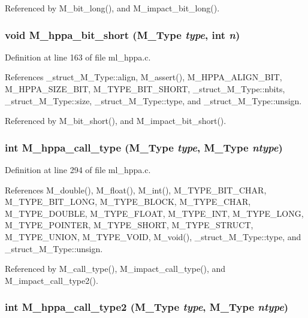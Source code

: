 Referenced by M\_\-bit\_\-long(), and M\_\-impact\_\-bit\_\-long().
\subsubsection{\setlength{\rightskip}{0pt plus 5cm}void M\_\-hppa\_\-bit\_\-short (\bf{M\_\-Type} {\em type}, int {\em n})}\label{m__hppa_8h_c495d0f8270eaa8cdfd5ea0fda482197}




Definition at line 163 of file ml\_\-hppa.c.

References \_\-struct\_\-M\_\-Type::align, M\_\-assert(), M\_\-HPPA\_\-ALIGN\_\-BIT, M\_\-HPPA\_\-SIZE\_\-BIT, M\_\-TYPE\_\-BIT\_\-SHORT, \_\-struct\_\-M\_\-Type::nbits, \_\-struct\_\-M\_\-Type::size, \_\-struct\_\-M\_\-Type::type, and \_\-struct\_\-M\_\-Type::unsign.

Referenced by M\_\-bit\_\-short(), and M\_\-impact\_\-bit\_\-short().
\subsubsection{\setlength{\rightskip}{0pt plus 5cm}int M\_\-hppa\_\-call\_\-type (\bf{M\_\-Type} {\em type}, \bf{M\_\-Type} {\em ntype})}\label{m__hppa_8h_659ffb78b03ab7d4c248e6ae8653d368}




Definition at line 294 of file ml\_\-hppa.c.

References M\_\-double(), M\_\-float(), M\_\-int(), M\_\-TYPE\_\-BIT\_\-CHAR, M\_\-TYPE\_\-BIT\_\-LONG, M\_\-TYPE\_\-BLOCK, M\_\-TYPE\_\-CHAR, M\_\-TYPE\_\-DOUBLE, M\_\-TYPE\_\-FLOAT, M\_\-TYPE\_\-INT, M\_\-TYPE\_\-LONG, M\_\-TYPE\_\-POINTER, M\_\-TYPE\_\-SHORT, M\_\-TYPE\_\-STRUCT, M\_\-TYPE\_\-UNION, M\_\-TYPE\_\-VOID, M\_\-void(), \_\-struct\_\-M\_\-Type::type, and \_\-struct\_\-M\_\-Type::unsign.

Referenced by M\_\-call\_\-type(), M\_\-impact\_\-call\_\-type(), and M\_\-impact\_\-call\_\-type2().
\subsubsection{\setlength{\rightskip}{0pt plus 5cm}int M\_\-hppa\_\-call\_\-type2 (\bf{M\_\-Type} {\em type}, \bf{M\_\-Type} {\em ntype})}\label{m__hppa_8h_2daad82249b0f31bdb3e89f16ad10a38}




